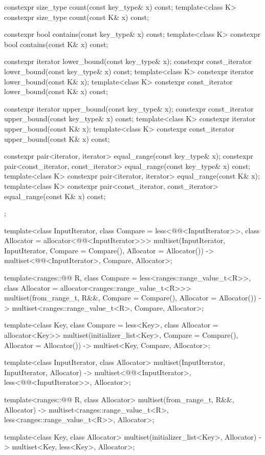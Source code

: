 \begin{codeblock}
{{    constexpr size_type      count(const key_type& x) const;
    template<class K> constexpr size_type count(const K& x) const;

    constexpr bool           contains(const key_type& x) const;
    template<class K> constexpr bool contains(const K& x) const;

    constexpr iterator       lower_bound(const key_type& x);
    constexpr const_iterator lower_bound(const key_type& x) const;
    template<class K> constexpr iterator       lower_bound(const K& x);
    template<class K> constexpr const_iterator lower_bound(const K& x) const;

    constexpr iterator       upper_bound(const key_type& x);
    constexpr const_iterator upper_bound(const key_type& x) const;
    template<class K> constexpr iterator       upper_bound(const K& x);
    template<class K> constexpr const_iterator upper_bound(const K& x) const;

    constexpr pair<iterator, iterator>               equal_range(const key_type& x);
    constexpr pair<const_iterator, const_iterator>   equal_range(const key_type& x) const;
    template<class K>
      constexpr pair<iterator, iterator>             equal_range(const K& x);
    template<class K>
      constexpr pair<const_iterator, const_iterator> equal_range(const K& x) const;
  };

  template<class InputIterator,
           class Compare = less<@@<InputIterator>>,
           class Allocator = allocator<@@<InputIterator>>>
    multiset(InputIterator, InputIterator,
             Compare = Compare(), Allocator = Allocator())
      -> multiset<@@<InputIterator>, Compare, Allocator>;

  template<ranges::@@ R, class Compare = less<ranges::range_value_t<R>>,
           class Allocator = allocator<ranges::range_value_t<R>>>
    multiset(from_range_t, R&&, Compare = Compare(), Allocator = Allocator())
      -> multiset<ranges::range_value_t<R>, Compare, Allocator>;

  template<class Key, class Compare = less<Key>, class Allocator = allocator<Key>>
    multiset(initializer_list<Key>, Compare = Compare(), Allocator = Allocator())
      -> multiset<Key, Compare, Allocator>;

  template<class InputIterator, class Allocator>
    multiset(InputIterator, InputIterator, Allocator)
      -> multiset<@@<InputIterator>,
                  less<@@<InputIterator>>, Allocator>;

  template<ranges::@@ R, class Allocator>
    multiset(from_range_t, R&&, Allocator)
      -> multiset<ranges::range_value_t<R>, less<ranges::range_value_t<R>>, Allocator>;

  template<class Key, class Allocator>
    multiset(initializer_list<Key>, Allocator) -> multiset<Key, less<Key>, Allocator>;
}
\end{codeblock}%
%

